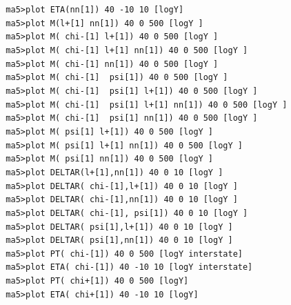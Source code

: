 \documentclass[a4paper, 10pt]{article}
\begin{document}
\texttt{ }\texttt{ }\texttt{ma5>plot ETA(nn[1]) 40 -10 10 [logY]\\
}
\texttt{ }\texttt{ }\texttt{ma5>plot M(l+[1] nn[1]) 40 0  500 [logY ]\\
}
\texttt{ }\texttt{ }\texttt{ma5>plot M(~chi-[1] l+[1]) 40 0  500 [logY ]\\
}
\texttt{ }\texttt{ }\texttt{ma5>plot M(~chi-[1] l+[1] nn[1]) 40 0  500 [logY ]\\
}
\texttt{ }\texttt{ }\texttt{ma5>plot M(~chi-[1] nn[1]) 40 0  500 [logY ]\\
}
\texttt{ }\texttt{ }\texttt{ma5>plot M(~chi-[1] ~psi[1]) 40 0  500 [logY ]\\
}
\texttt{ }\texttt{ }\texttt{ma5>plot M(~chi-[1] ~psi[1] l+[1]) 40 0  500 [logY ]\\
}
\texttt{ }\texttt{ }\texttt{ma5>plot M(~chi-[1] ~psi[1] l+[1] nn[1]) 40 0  500 [logY ]\\
}
\texttt{ }\texttt{ }\texttt{ma5>plot M(~chi-[1] ~psi[1] nn[1]) 40 0  500 [logY ]\\
}
\texttt{ }\texttt{ }\texttt{ma5>plot M(~psi[1] l+[1]) 40 0  500 [logY ]\\
}
\texttt{ }\texttt{ }\texttt{ma5>plot M(~psi[1] l+[1] nn[1]) 40 0  500 [logY ]\\
}
\texttt{ }\texttt{ }\texttt{ma5>plot M(~psi[1] nn[1]) 40 0  500 [logY ]\\
}
\texttt{ }\texttt{ }\texttt{ma5>plot DELTAR(l+[1],nn[1]) 40 0 10 [logY ]\\
}
\texttt{ }\texttt{ }\texttt{ma5>plot DELTAR(~chi-[1],l+[1]) 40 0 10 [logY ]\\
}
\texttt{ }\texttt{ }\texttt{ma5>plot DELTAR(~chi-[1],nn[1]) 40 0 10 [logY ]\\
}
\texttt{ }\texttt{ }\texttt{ma5>plot DELTAR(~chi-[1],~psi[1]) 40 0 10 [logY ]\\
}
\texttt{ }\texttt{ }\texttt{ma5>plot DELTAR(~psi[1],l+[1]) 40 0 10 [logY ]\\
}
\texttt{ }\texttt{ }\texttt{ma5>plot DELTAR(~psi[1],nn[1]) 40 0 10 [logY ]\\
}
\texttt{ }\texttt{ }\texttt{ma5>plot  PT(~chi-[1]) 40 0  500 [logY interstate]\\
}
\texttt{ }\texttt{ }\texttt{ma5>plot ETA(~chi-[1]) 40 -10 10 [logY interstate]\\
}
\texttt{ }\texttt{ }\texttt{ma5>plot  PT(~chi+[1]) 40 0  500 [logY]\\
}
\texttt{ }\texttt{ }\texttt{ma5>plot ETA(~chi+[1]) 40 -10 10 [logY]\\
}
\end{document}
